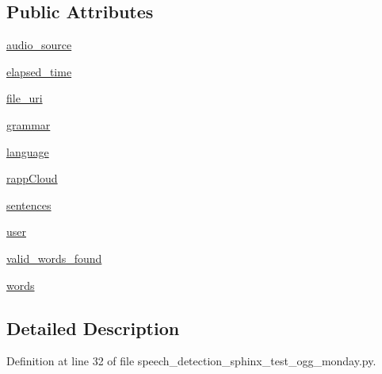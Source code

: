 \subsection*{Public Attributes}
\begin{DoxyCompactItemize}
\item 
\hyperlink{classspeech__detection__sphinx__test__ogg__monday_1_1RappInterfaceTest_aa6a6b18d54389839ff80352a31a97c29}{audio\-\_\-source}
\item 
\hyperlink{classspeech__detection__sphinx__test__ogg__monday_1_1RappInterfaceTest_a3f85fa18d4b2184f7bf358bba7670118}{elapsed\-\_\-time}
\item 
\hyperlink{classspeech__detection__sphinx__test__ogg__monday_1_1RappInterfaceTest_a710df5163a248ebf13b2a7fedbb0fd58}{file\-\_\-uri}
\item 
\hyperlink{classspeech__detection__sphinx__test__ogg__monday_1_1RappInterfaceTest_a258e32f8cd81cc93a70fc8ba8414571e}{grammar}
\item 
\hyperlink{classspeech__detection__sphinx__test__ogg__monday_1_1RappInterfaceTest_a82c32f0743e553471ae8ec7051ef2436}{language}
\item 
\hyperlink{classspeech__detection__sphinx__test__ogg__monday_1_1RappInterfaceTest_ab0de2cb5214f9665b8772bbf209b3b37}{rapp\-Cloud}
\item 
\hyperlink{classspeech__detection__sphinx__test__ogg__monday_1_1RappInterfaceTest_a8b4f5349ba6a515aecfa9660da993609}{sentences}
\item 
\hyperlink{classspeech__detection__sphinx__test__ogg__monday_1_1RappInterfaceTest_acce31c60cd02612817b66826206d4014}{user}
\item 
\hyperlink{classspeech__detection__sphinx__test__ogg__monday_1_1RappInterfaceTest_a4cc4a37f471fb42e382e3bdc66c0a610}{valid\-\_\-words\-\_\-found}
\item 
\hyperlink{classspeech__detection__sphinx__test__ogg__monday_1_1RappInterfaceTest_a7fb566119671b1a8fa9f991d6eb919be}{words}
\end{DoxyCompactItemize}


\subsection{Detailed Description}


Definition at line 32 of file speech\-\_\-detection\-\_\-sphinx\-\_\-test\-\_\-ogg\-\_\-monday.\-py.




